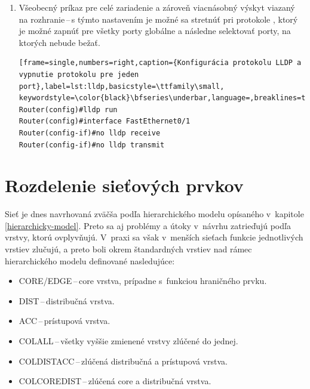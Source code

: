 \begin{enumerate}
\begin{minipage}{\linewidth}		
\begin{lstlisting}[frame=single,numbers=right,caption={Konfigurácia autentizácie OSPF na porte alebo v~proccese},label=lst:ospf-auth,basicstyle=\ttfamily\small, keywordstyle=\color{black}\bfseries\underbar,language=,breaklines=true]
Router(config)#interface FastEthernet0/1
Router(config-if)#ip ospf message-digest-key 1 md5 heslo
Router(config-if)#ip ospf authentication message-digest
Router(config)#router ospf 1
Router(config)#area 0 authentication message-digest
Router(config)#area 0 authentication key-chain 1
\end{lstlisting}
\end{minipage}
	
	
	\item \vspace{2em} Všeobecný príkaz pre celé zariadenie a zároveň viacnásobný výskyt viazaný na rozhranie\,--\,s týmto nastavením je možné sa stretnúť pri protokole , ktorý je možné zapnúť pre všetky porty globálne a následne selektovať porty, na ktorých nebude bežať.
	
\begin{minipage}{\linewidth}		
\begin{lstlisting}[frame=single,numbers=right,caption={Konfigurácia protokolu LLDP a vypnutie protokolu pre jeden port},label=lst:lldp,basicstyle=\ttfamily\small, keywordstyle=\color{black}\bfseries\underbar,language=,breaklines=true]
Router(config)#lldp run
Router(config)#interface FastEthernet0/1
Router(config-if)#no lldp receive
Router(config-if)#no lldp transmit\end{lstlisting}
\end{minipage}
	
\end{enumerate}

\section{Rozdelenie sieťových prvkov}
\label{hierarchydesign}
Sieť je dnes navrhovaná zväčša podľa hierarchického modelu opísaného v~kapitole \ref{hierarchicky-model}. Preto sa aj problémy a útoky v~návrhu zatrieďujú podľa vrstvy, ktorú ovplyvňujú. V~praxi sa však v~menších sieťach funkcie jednotlivých vrstiev zlučujú, a preto boli okrem štandardných vrstiev nad rámec hierarchického modelu definované nasledujúce:

\begin{itemize}
	\item CORE/EDGE\,--\,core vrstva, prípadne s~funkciou hraničného prvku.
	\item DIST\,--\,distribučná vrstva.
	\item ACC\,--\,prístupová vrstva.
	\item COLALL\,--\,všetky vyššie zmienené vrstvy zlúčené do jednej.
	\item COLDISTACC\,--\,zlúčená distribučná a prístupová vrstva.
	\item COLCOREDIST\,--\,zlúčená core a distribučná vrstva.
\end{itemize}

